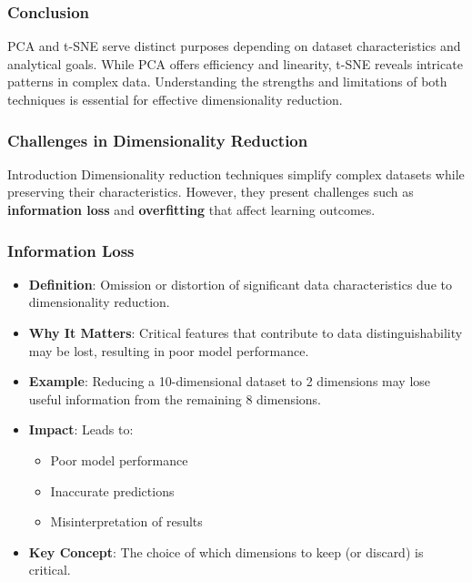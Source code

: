 \documentclass[aspectratio=169]{beamer}
\begin{document}
\begin{frame}[fragile]
    \frametitle{Conclusion}
    
    PCA and t-SNE serve distinct purposes depending on dataset characteristics and analytical goals. While PCA offers efficiency and linearity, t-SNE reveals intricate patterns in complex data. Understanding the strengths and limitations of both techniques is essential for effective dimensionality reduction.
\end{frame}

\begin{frame}[fragile]
    \frametitle{Challenges in Dimensionality Reduction}
    \begin{block}{Introduction}
        Dimensionality reduction techniques simplify complex datasets while preserving their characteristics. However, they present challenges such as \textbf{information loss} and \textbf{overfitting} that affect learning outcomes.
    \end{block}
\end{frame}

\begin{frame}[fragile]
    \frametitle{Information Loss}
    \begin{itemize}
        \item \textbf{Definition}: Omission or distortion of significant data characteristics due to dimensionality reduction.
        
        \item \textbf{Why It Matters}: Critical features that contribute to data distinguishability may be lost, resulting in poor model performance.
        
        \item \textbf{Example}: Reducing a 10-dimensional dataset to 2 dimensions may lose useful information from the remaining 8 dimensions.
        
        \item \textbf{Impact}: Leads to:
        \begin{itemize}
            \item Poor model performance
            \item Inaccurate predictions
            \item Misinterpretation of results
        \end{itemize}
        
        \item \textbf{Key Concept}: The choice of which dimensions to keep (or discard) is critical.
    \end{itemize}
\end{frame}
\end{document}
